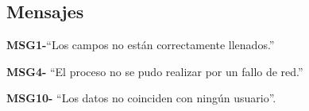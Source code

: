 \subsection{Mensajes}

\begin{Citemize}
	\item {\bf MSG1-}{``Los campos no están correctamente llenados.''}
	\item {\bf MSG4-}  ``El proceso no se pudo realizar por un fallo de red.''
	\item {\bf MSG10-}  ``Los datos no coinciden con ningún usuario''.
\end{Citemize}
